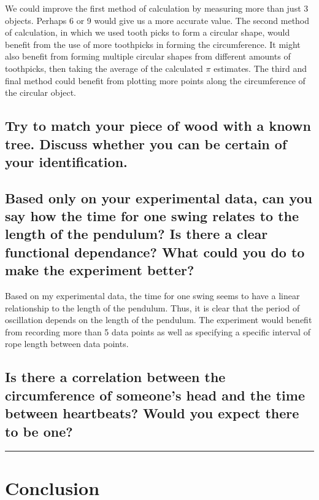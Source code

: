 \documentclass{article}
\begin{document}
We could improve the first method of calculation by measuring more than just 
3 objects. Perhaps 6 or 9 would give us a more accurate value. The second method
of calculation, in which we used tooth picks to form a circular shape, would benefit 
from the use of more toothpicks in forming the circumference. It might also benefit 
from forming multiple circular shapes from different amounts of toothpicks, then taking 
the average of the calculated $\pi$ estimates. The third and final method could benefit 
from plotting more points along the circumference of the circular object. 

\subsection{Try to match your piece of wood with a known 
tree. Discuss whether you can be certain of your 
identification.}

\subsection{Based only on your experimental data, can you 
say how the time for one swing relates to the length 
of the pendulum? Is there a clear functional 
dependance? What could you do to make the experiment better?}
Based on my experimental data, the time for one swing seems to have a 
linear relationship to the length of the pendulum. Thus, it is clear that
the period of oscillation depends on the length of the pendulum. The experiment 
would benefit from recording more than 5 data points as well as specifying a specific 
interval of rope length between data points.

\subsection{Is there a correlation between the circumference
of someone's head and the time between heartbeats? Would you 
expect there to be one?}

\vspace{1em}
\hrule
\vspace{1em}
\section{Conclusion}
\end{document}

